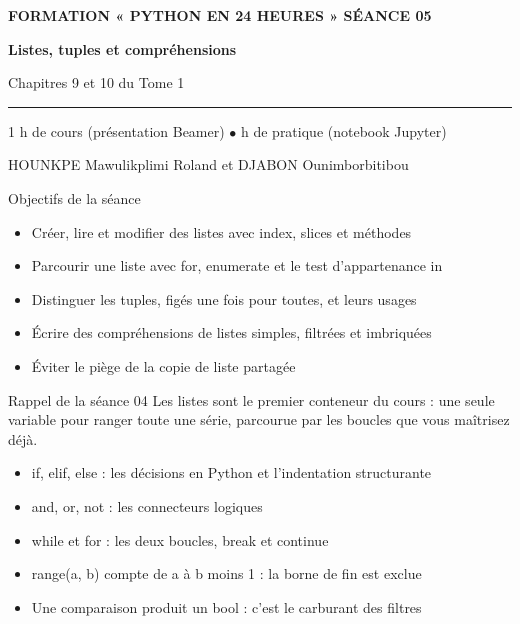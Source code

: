 \documentclass[aspectratio=169,11pt]{beamer}
\begin{document}
{%
\begin{frame}[plain]
\vspace{10mm}
{\color{PyJaune}\small\bfseries FORMATION « PYTHON EN 24 HEURES » \quad\textbar\quad SÉANCE 05\par}
\vspace{4mm}
{\color{white}\Huge\bfseries Listes, tuples et compréhensions\par}
\vspace{4mm}
{\color{PyBleuClair}\large Chapitres 9 et 10 du Tome 1\par}
\vspace{7mm}
{\color{PyJaune}\rule{34mm}{2.2pt}\par}
\vspace{7mm}
{\color{white}\normalsize 1 h de cours (présentation Beamer) \quad$\bullet$ h de pratique (notebook Jupyter)\par}
\vspace{2.5mm}
{\color{PyBleuClair}\normalsize HOUNKPE Mawulikplimi Roland et DJABON Ounimborbitibou\par}
\end{frame}
}
\begin{frame}{Objectifs de la séance}
\begin{itemize}
  \item Créer, lire et modifier des listes avec index, slices et méthodes
  \item Parcourir une liste avec for, enumerate et le test d'appartenance in
  \item Distinguer les tuples, figés une fois pour toutes, et leurs usages
  \item Écrire des compréhensions de listes simples, filtrées et imbriquées
  \item Éviter le piège de la copie de liste partagée
\end{itemize}
\end{frame}
\begin{frame}{Rappel de la séance 04}
Les listes sont le premier conteneur du cours : une seule variable pour ranger toute une série, parcourue par les boucles que vous maîtrisez déjà.

\begin{itemize}
  \item if, elif, else : les décisions en Python et l'indentation structurante
  \item and, or, not : les connecteurs logiques
  \item while et for : les deux boucles, break et continue
  \item range(a, b) compte de a à b moins 1 : la borne de fin est exclue
  \item Une comparaison produit un bool : c'est le carburant des filtres
\end{itemize}
\end{frame}
\end{document}
